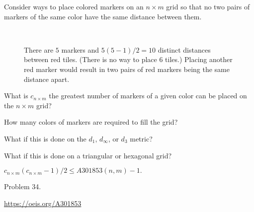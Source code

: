 \documentclass{article}
\begin{document}
  Consider ways to place colored markers on an $n \times m$ grid so that no two
  pairs of markers of the same color have the same distance between them.

\begin{figure}[!h]
  \centering
  \\
  \caption{
    There are $5$ markers and $5(5-1)/2 = 10$ distinct distances between red
    tiles. (There is no way to place $6$ tiles.)
    Placing another red marker would result in two pairs of red markers being
    the same distance apart.
  }
\end{figure}

\begin{question}
  What is $c_{n \times m}$ the greatest number of markers of a given color can
  be placed on the $n \times m$ grid?
\end{question}
\begin{related}
  \item How many colors of markers are required to fill the grid?
  \item What if this is done on the $d_1$, $d_\infty$, or $d_3$ metric?
  \item What if this is done on a triangular or hexagonal grid?
\end{related}
\begin{note}
  $c_{n \times m}(c_{n \times m}-1)/2 \leq A301853(n, m) - 1.$
\end{note}
\begin{references}
  \item Problem 34.
  \item \url{https://oeis.org/A301853}
\end{references}
\end{document}
